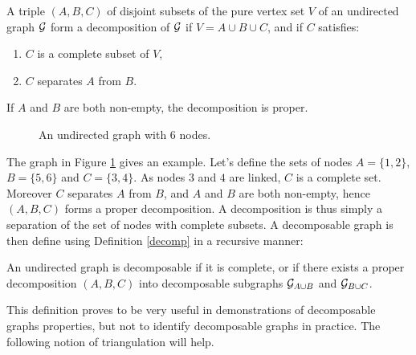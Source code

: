  \begin{definition}\label{decomp}
 A triple $(A, B, C)$ of disjoint subsets of the pure vertex set $V$ of an undirected graph $\mathcal{G}$ form a decomposition of $\mathcal{G}$ if $V=A\cup B \cup C$, and if $C$ satisfies:
 \begin{enumerate}[label=(\roman*)]
 \item $C$ is a complete subset of  $V$,
 \item $C$ separates $A$ from $B$.
 \end{enumerate}
 If $A$ and $B$ are both non-empty, the decomposition is proper.
 \end{definition}
 \begin{figure}[H]
 \begin{center}
 \caption{An undirected graph with 6 nodes.}
  \label{ex:graph0}
    \end{center}
\end{figure}
The graph in Figure \ref{ex:graph0} gives an example. Let's define the sets of nodes $A=\{1,2\}$, $B=\{5,6\}$ and $C=\{3,4\}$. As nodes $3$ and $4$ are linked, $C$ is a complete set. Moreover $C$ separates $A$ from $B$, and $A$ and $B$ are both non-empty, hence $(A, B, C)$  forms a proper decomposition. A decomposition is thus simply a separation of the set of nodes with complete subsets. A decomposable graph is then define using Definition \ref{decomp} in a recursive manner:
 \begin{definition}
 An undirected graph is decomposable if it is complete, or if there exists a proper decomposition $(A, B, C)$ into decomposable subgraphs $\mathcal{G}_{A\cup B}$ and $\mathcal{G}_{B\cup C}$.
 \end{definition}
 This definition proves to be very useful in demonstrations of decomposable graphs properties, but not to identify decomposable graphs in practice. The following notion of triangulation will help.
 
